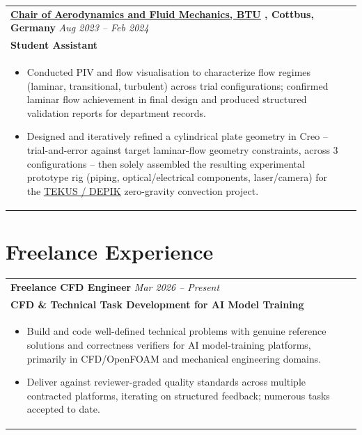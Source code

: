 \documentclass[a4paper,8pt]{article}
\newcommand{\ulhref}[2]{%
  {\hypersetup{urlcolor=.}\textcolor{.}{\href{#1}{\uline{#2}}}}%
}
\begin{document}
\begin{tabularx}{\linewidth}{ @{}l r@{} }
\textbf{{\ulhref{https://www.b-tu.de/fg-aerodynamik-stroemungslehre}{Chair of Aerodynamics and Fluid Mechanics, BTU}}, Cottbus, Germany} \hfill \color[HTML]{371e77} \textit{Aug 2023 – Feb 2024}\\[1pt]
\color[HTML]{371e77}\textbf{Student Assistant}\ \hfill \color[HTML]{4B28A4}  \\[1pt]
\begin{minipage}[t]{\linewidth}
    \begin{itemize}[nosep,after=\strut, leftmargin=*, itemsep=1pt]
        \item Conducted PIV and flow visualisation to characterize flow regimes (laminar, transitional, turbulent) across trial configurations; confirmed laminar flow achievement in final design and produced structured validation reports for department records.
        \item Designed and iteratively refined a cylindrical plate geometry in Creo -- trial-and-error against target laminar-flow geometry constraints, across 3 configurations -- then solely assembled the resulting experimental prototype rig (piping, optical/electrical components, laser/camera) for the \ulhref{https://www.b-tu.de/en/news/article/27186-weightless-research-btu-team-investigates-convection-currents-in-free-fall}{TEKUS / DEPIK} zero-gravity convection project.
    \end{itemize}
\end{minipage}
\end{tabularx}

\section{Freelance Experience}
\begin{tabularx}{\linewidth}{ @{}l r@{} }
\textbf{Freelance CFD Engineer} \hfill \color[HTML]{371e77} \textit{Mar 2026 -- Present} \\[1pt]
\color[HTML]{371e77}\textbf{CFD \& Technical Task Development for AI Model Training}\ \hfill \color[HTML]{4B28A4} \\[1pt]
\begin{minipage}[t]{\linewidth}
    \begin{itemize}[nosep,after=\strut, leftmargin=*, itemsep=1pt]
        \item Build and code well-defined technical problems with genuine reference solutions and correctness verifiers for AI model-training platforms, primarily in CFD/OpenFOAM and mechanical engineering domains.
        \item Deliver against reviewer-graded quality standards across multiple contracted platforms, iterating on structured feedback; numerous tasks accepted to date.
    \end{itemize}
\end{minipage}
\end{tabularx}
\end{document}
